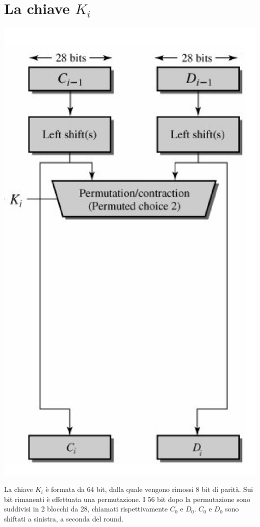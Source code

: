\documentclass[11pt, oneside]{article}   	%
\begin{document}
\section*{La chiave $K_i$}
\begin{center}
\includegraphics[scale= 0.6]{k1}
\end{center}
La chiave $K_i$ è formata da 64 bit, dalla quale vengono rimossi 8 bit di parità. Sui bit rimanenti è effettuata una permutazione. I 56 bit dopo la permutazione sono suddivisi in 2 blocchi da 28, chiamati rispettivamente $C_0$ e $D_0$. $C_0$ e $D_0$ sono shiftati a sinistra, a seconda del round.\\
\end{document}
